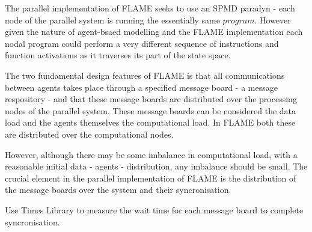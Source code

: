The parallel implementation of FLAME seeks to use an SPMD paradyn - each node of the parallel system is running the essentially same $program$. However given the nature of agent-bsaed modelling and the FLAME implementation each nodal program could perform a very different sequence of instructions and function activations as it traverses its part of the state space. 

The two fundamental design features of FLAME is that all communications between agents takes place through a specified message board - a message respository - and that these message boards are distributed over the processing nodes of the parallel system. These message boards can be considered the data load and the agents themselves the computational load. In FLAME both these are distributed over the computational nodes.

However, although there may be some imbalance in computational load, with a reasonable initial data - agents - distribution, any imbalance should be small. The crucial element in the parallel implementation of FLAME is the distribution of the message boards over the system and their syncronisation.

Use Times Library to measure the wait time for each message board to complete syncronisation.


 